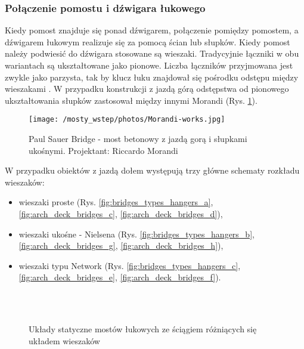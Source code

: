 \subsubsection{Połączenie pomostu i dźwigara łukowego}
Kiedy pomost znajduje się ponad dźwigarem, połączenie pomiędzy pomostem, a dźwigarem łukowym realizuje się za pomocą ścian lub słupków. Kiedy pomost należy podwiesić do dźwigara stosowane są wieszaki. Tradycyjnie łączniki w obu wariantach są ukształtowane jako pionowe. Liczba łączników przyjmowana jest zwykle jako parzysta, tak by klucz łuku znajdował się pośrodku odstępu między wieszakami \parencite{Szczygie1978}. W przypadku konstrukcji z jazdą górą odstępstwa od pionowego ukształtowania słupków zastosował między innymi Morandi (Rys. \ref{fig:bridges_morandi}). 

\begin{figure}[hbt!]
	\centering
	\texttt{[image: /mosty\_wstep/photos/Morandi-works.jpg]}
	\captionsetup{justification=centering}
	\caption{Paul Sauer Bridge - most betonowy z jazdą gorą i słupkami ukośnymi. Projektant: Riccardo Morandi \parencite{Morandi1962}}
	\label{fig:bridges_morandi}
\end{figure}

\pagebreak[4]
W przypadku obiektów z jazdą dołem występują trzy główne schematy rozkładu wieszaków:
\begin{itemize}
	\item wieszaki proste (Rys. \ref{fig:bridges_types_hangers_a}, \ref{fig:arch_deck_bridges_c}, \ref{fig:arch_deck_bridges_d}),
	\item wieszaki ukośne - Nielsena (Rys. \ref{fig:bridges_types_hangers_b}, \ref{fig:arch_deck_bridges_g},  \ref{fig:arch_deck_bridges_h}),
	\item wieszaki typu Network (Rys. \ref{fig:bridges_types_hangers_c}, \ref{fig:arch_deck_bridges_e}, \ref{fig:arch_deck_bridges_f}).
\end{itemize}

\begin{figure}[h]
	\centering
	  \\
	 \\
	\captionsetup{justification=centering}
	\caption{Układy statyczne mostów łukowych ze ściągiem różniących się układem wieszaków}
	\label{fig:bridges_types_hangers}
\end{figure}

